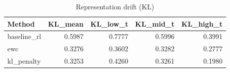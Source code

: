 \begin{table}[htbp]
\centering
\caption{Representation drift (KL)}
\label{tab:repr-drift}
\begin{tabular}{lrrrr}
\toprule
\textbf{Method} & \textbf{KL\_mean} & \textbf{KL\_low\_t} & \textbf{KL\_mid\_t} & \textbf{KL\_high\_t} \\
\midrule
baseline\_rl & 0.5987 & 0.7777 & 0.5996 & 0.3991 \\
ewc & 0.3276 & 0.3602 & 0.3282 & 0.2777 \\
kl\_penalty & 0.3253 & 0.4260 & 0.3261 & 0.1980 \\
\bottomrule
\end{tabular}
\end{table}